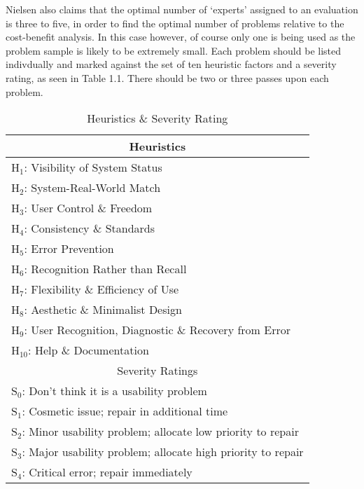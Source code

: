 \documentclass[11pt, english]{article}
\begin{document}
	Nielsen also claims that the optimal number of `experts' assigned to an evaluation is three to five, in order to find the optimal number of problems relative to the cost-benefit analysis. In this case however, of course only one is being used as the problem sample is likely to be extremely small. Each problem should be listed indivdually and marked against the set of ten heuristic factors and a severity rating, as seen in Table 1.1. There should be two or three passes upon each problem.\\

	\begin{table}[h]
		\scriptsize
		\renewcommand{\arraystretch}{1.25}
	\begin{center}
	\begin{tabular}{c}
		\hline
		Heuristics\\
		\hline
		\multicolumn{1}{l}{$\mathrm{H_{1}}$: Visibility of System Status}\\
		\multicolumn{1}{l}{$\mathrm{H_{2}}$: System-Real-World Match}\\
		\multicolumn{1}{l}{$\mathrm{H_{3}}$: User Control \& Freedom}\\
		\multicolumn{1}{l}{$\mathrm{H_{4}}$: Consistency \& Standards}\\
		\multicolumn{1}{l}{$\mathrm{H_{5}}$: Error Prevention}\\
		\multicolumn{1}{l}{$\mathrm{H_{6}}$: Recognition Rather than Recall}\\
		\multicolumn{1}{l}{$\mathrm{H_{7}}$: Flexibility \& Efficiency of Use}\\
		\multicolumn{1}{l}{$\mathrm{H_{8}}$: Aesthetic \& Minimalist Design}\\
		\multicolumn{1}{l}{$\mathrm{H_{9}}$: User Recognition, Diagnostic \& Recovery from Error}\\
		\multicolumn{1}{l}{$\mathrm{H_{10}}$: Help \& Documentation}\\
		\hline
		Severity Ratings\\
		\hline
		\multicolumn{1}{l}{$\mathrm{S_{0}}$: Don't think it is a usability problem}\\
		\multicolumn{1}{l}{$\mathrm{S_{1}}$: Cosmetic issue; repair in additional time}\\
		\multicolumn{1}{l}{$\mathrm{S_{2}}$: Minor usability problem; allocate low priority to repair}\\
		\multicolumn{1}{l}{$\mathrm{S_{3}}$: Major usability problem; allocate high priority to repair}\\
		\multicolumn{1}{l}{$\mathrm{S_{4}}$: Critical error; repair immediately}\\
		\hline
	\end{tabular}
		\caption{Heuristics \& Severity Rating}
	\end{center}
	\end{table}
\end{document}
